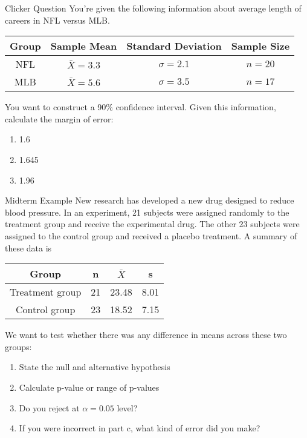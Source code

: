 \documentclass{beamer}
\begin{document}
\begin{frame}{Clicker Question}
	You're given the following information about average length of careers in NFL versus MLB.

	\begin{center}
		\begin{tabular}{|c|c|c|c|}
			\hline
			\textbf{Group} & \textbf{Sample Mean}  & \textbf{Standard Deviation} & \textbf{Sample Size} \\
			\hline
			NFL & $\bar{X} = 3.3$ & $\sigma = 2.1$ & $n = 20$ \\
			\hline
			MLB & $\bar{X} = 5.6$ & $\sigma=3.5$ & $n = 17$ \\
			\hline
		\end{tabular}
	\end{center}

	You want to construct a 90\% confidence interval. Given this information, calculate the margin of error:
	
	\begin{enumerate}[label=(\alph*)]
		\item 1.6
		
		\item 1.645
		
		\item 1.96
	\end{enumerate}
\end{frame}


\begin{frame}{Midterm Example}
	\footnotesize{New research has developed a new drug designed to reduce blood pressure. In an experiment, 21 subjects were assigned randomly to the treatment group and receive the experimental drug. The other 23 subjects were assigned to the control group and received a placebo treatment. A summary of these data is}

	\begin{center}
		\begin{tabular}{|c|c|c|c|}
			\hline 
			\textbf{Group} & \textbf{n} & $\bar{X}$ & \textbf{s} \\ 
			\hline
			Treatment group & 21 & 23.48 & 8.01 \\
			Control group   & 23 & 18.52 & 7.15 \\
			\hline
		\end{tabular}
	\end{center}

	We want to test whether there was any difference in means across these two groups:
	
	\begin{enumerate}[label=(\alph*)]
		\item State the null and alternative hypothesis 
		\item Calculate p-value or range of p-values
		\item Do you reject at $\alpha=0.05$ level?
		\item If you were incorrect in part c, what kind of error did you make? 
	\end{enumerate}
\end{frame}
\end{document}
